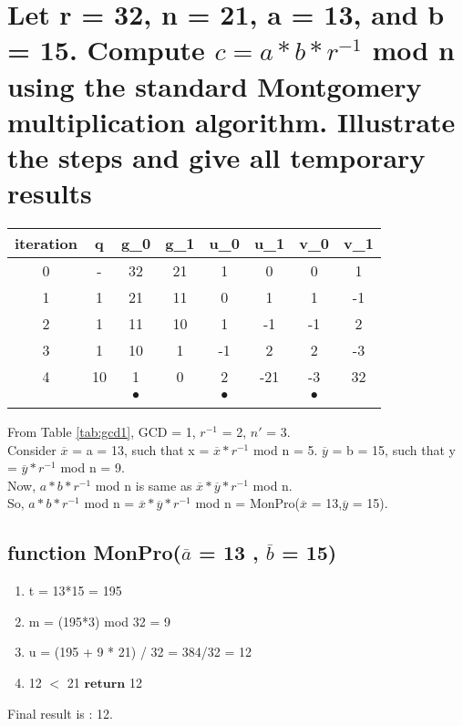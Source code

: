 \documentclass[11pt, pdftex]{article}
\begin{document}
\section{Let r = 32, n = 21, a = 13, and b = 15. Compute $c = a * b * r^{-1}$ mod n using the standard Montgomery multiplication algorithm. Illustrate the steps and give all temporary results}
\begin{center}
\begin{tabular}{c||c|c|c|c|c|c|c} 
iteration & q & g_{0} & g_{1} & u_{0} & u_{1} & v_{0} & v_{1}\\
\hline
0 & - & 32 & 21 & 1 & 0 & 0 & 1 \\
\hline
1 & 1 & 21 & 11 & 0 & 1 & 1 & -1 \\
\hline
2 & 1 & 11 & 10 & 1 & -1 & -1 & 2\\
\hline
3 & 1 & 10 & 1 & -1 & 2 & 2 & -3\\
\hline
4 & 10 & 1 & 0 & 2 & -21 & -3 & 32 \\
\hline
& & $\bullet$ & & $\bullet$ & & $\bullet$ & \\
\label{tab:gcd1}
\end{tabular}
\end{center}
From Table \ref{tab:gcd1}, GCD = 1, $r^{-1}$ = 2, $n'$ = 3. \\
Consider $\overline{x}$ = a = 13, such that x = $\overline{x} * r^{-1} $ mod n = 5. $\overline{y}$ = b = 15, such that y = $\overline{y} * r^{-1} $ mod n = 9. \\
Now, $a * b * r^{-1}$ mod n is same as $\overline{x} * \overline{y} * r^{-1}$ mod n.\\
So, $a * b * r^{-1}$ mod n = $\overline{x} * \overline{y} * r^{-1}$ mod n = MonPro($\overline{x}$ = 13,$\overline{y}$ = 15).

\subsection{function MonPro($\overline{a}$ = 13 , $\overline{b}$ = 15)}
\begin{enumerate}
\item t = 13*15 = 195
\item m = (195*3) mod 32 = 9
\item u = (195 + 9 * 21) / 32 = 384/32 = 12
\item 12 $<$ 21 $\textbf{return}$ 12
\end{enumerate}
Final result is : 12.
\end{document}
